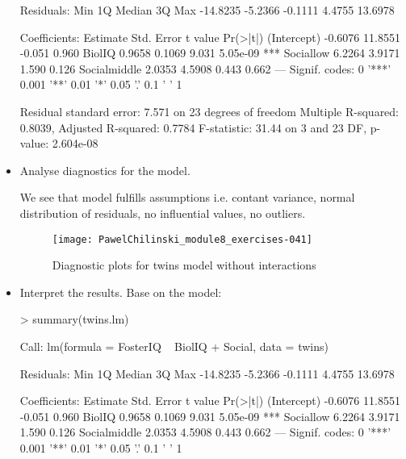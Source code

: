 \documentclass[a4paper]{article}
\begin{document}
\begin{itemize}
\begin{Schunk}
\begin{Soutput}
Residuals:
     Min       1Q   Median       3Q      Max 
-14.8235  -5.2366  -0.1111   4.4755  13.6978 

Coefficients:
             Estimate Std. Error t value Pr(>|t|)    
(Intercept)   -0.6076    11.8551  -0.051    0.960    
BiolIQ         0.9658     0.1069   9.031 5.05e-09 ***
Sociallow      6.2264     3.9171   1.590    0.126    
Socialmiddle   2.0353     4.5908   0.443    0.662    
---
Signif. codes:  0 '***' 0.001 '**' 0.01 '*' 0.05 '.' 0.1 ' ' 1

Residual standard error: 7.571 on 23 degrees of freedom
Multiple R-squared:  0.8039,	Adjusted R-squared:  0.7784 
F-statistic: 31.44 on 3 and 23 DF,  p-value: 2.604e-08
\end{Soutput}
\end{Schunk}

\item Analyse diagnostics for the model.

We see that model fulfills assumptions i.e. contant variance, normal
distribution of residuals, no influential values, no outliers. 
\begin{figure}[H]
\begin{center}
\texttt{[image: PawelChilinski\_module8\_exercises-041]}
\caption{Diagnostic plots for twins model without interactions}
\end{center}
\end{figure}

\item Interpret the results.
Base on the model:
\begin{Schunk}
\begin{Sinput}
> summary(twins.lm)
\end{Sinput}
\begin{Soutput}
Call:
lm(formula = FosterIQ ~ BiolIQ + Social, data = twins)

Residuals:
     Min       1Q   Median       3Q      Max 
-14.8235  -5.2366  -0.1111   4.4755  13.6978 

Coefficients:
             Estimate Std. Error t value Pr(>|t|)    
(Intercept)   -0.6076    11.8551  -0.051    0.960    
BiolIQ         0.9658     0.1069   9.031 5.05e-09 ***
Sociallow      6.2264     3.9171   1.590    0.126    
Socialmiddle   2.0353     4.5908   0.443    0.662    
---
Signif. codes:  0 '***' 0.001 '**' 0.01 '*' 0.05 '.' 0.1 ' ' 1


\end{Soutput}
\end{Schunk}
\end{itemize}
\end{document}

